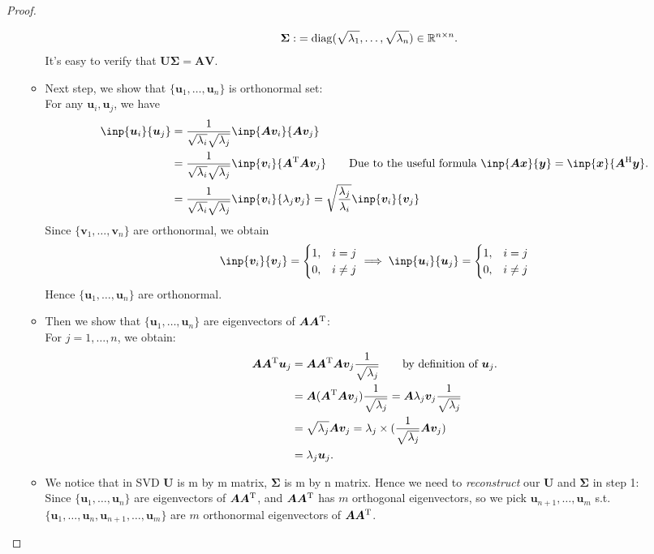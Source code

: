 \begin{proof}
\begin{itemize}
\begin{itemize}
\begin{align*}
\bm\Sigma:&=\operatorname{diag}(\sqrt{\lambda_1},\dots,\sqrt{\lambda_n})\in\mathbb{R}^{n\times n}.
\end{align*}
It's easy to verify that $\bm U\bm\Sigma=\bm{AV}$.
\item
Next step, we show that $\{\bm u_1,\dots,\bm u_n\}$ is orthonormal set:\\
For any $\bm u_i,\bm u_j$, we have
\begin{align*}
\inp{\bm u_i}{\bm u_j}&=\frac{1}{\sqrt{\lambda_i}\sqrt{\lambda_j}}\inp{\bm A\bm v_i}{\bm A\bm v_j}\\
&=\frac{1}{\sqrt{\lambda_i}\sqrt{\lambda_j}}\inp{\bm v_i}{\bm A\trans\bm A\bm v_j}
\qquad\text{Due to the useful formula $\inp{\bm{Ax}}{\bm y}=\inp{\bm x}{\bm A\Her\bm y}$.}
\\
&=\frac{1}{\sqrt{\lambda_i}\sqrt{\lambda_j}}\inp{\bm v_i}{\lambda_j\bm v_j}=
\sqrt{\frac{\lambda_j}{\lambda_i}}\inp{\bm v_i}{\bm v_j}
\end{align*}
Since $\{\bm v_1,\dots,\bm v_n\}$ are orthonormal, we obtain
\[
\inp{\bm v_i}{\bm v_j}=\begin{cases}
1,&i=j\\
0,&i\ne j
\end{cases}\implies
\inp{\bm u_i}{\bm u_j}=\begin{cases}
1,&i=j\\
0,&i\ne j
\end{cases}
\]
Hence $\{\bm u_1,\dots,\bm u_n\}$ are orthonormal.
\item
Then we show that $\{\bm u_1,\dots,\bm u_n\}$ are eigenvectors of $\bm A\bm A^{\mathrm T}$:\\
For $j=1,\dots,n$, we obtain:
\begin{align*}
\bm A\bm A^{\mathrm T}\bm u_j&=\bm A\bm A^{\mathrm T}\bm A\bm v_j\frac{1}{\sqrt{\lambda_j}}\qquad\text{by definition of $\bm u_j$.}\\
&=\bm A(\bm A^{\mathrm T}\bm A\bm v_j)\frac{1}{\sqrt{\lambda_j}}=\bm A\lambda_j\bm v_j\frac{1}{\sqrt{\lambda_j}}\\
&=\sqrt{\lambda_j}\bm A\bm v_j=\lambda_j\times(\frac{1}{\sqrt{\lambda_j}}\bm A\bm v_j)\\
&=\lambda_j\bm u_j.
\end{align*}
\item
We notice that in SVD $\bm U$ is m by m matrix, $\bm\Sigma$ is m by n matrix. Hence we need to \textit{reconstruct} our $\bm U$ and $\bm\Sigma$ in step 1:\\
Since $\{\bm u_1,\dots,\bm u_n\}$ are eigenvectors of $\bm A\bm A^{\mathrm T}$, and $\bm A\bm A^{\mathrm T}$ has $m$ orthogonal eigenvectors, so we pick $\bm u_{n+1},\dots,\bm u_m$ s.t. $\{\bm u_1,\dots,\bm u_{n},\bm u_{n+1},\dots,\bm u_m\}$ are $m$ orthonormal eigenvectors of $\bm A\bm A^{\mathrm T}$.\\

\end{itemize}
\end{itemize}
\end{proof}
